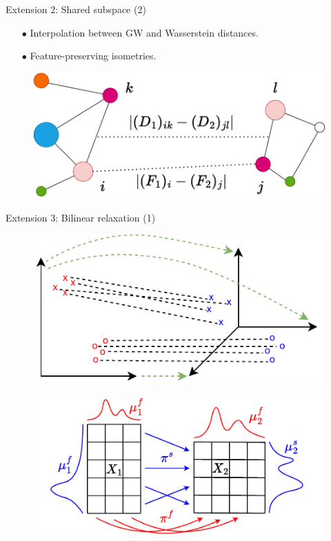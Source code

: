 \documentclass{beamer}
\begin{document}
\begin{frame}{Extension 2: Shared subspace (2)}
  \begin{minipage}[t]{0.6\linewidth}
    \begin{itemize}
      \item[$\bullet$] Interpolation between GW and Wasserstein distances.
      \item[$\bullet$] Feature-preserving isometries.
    \end{itemize}
    \end{minipage}%
    \hfill%
    \hspace{-6cm}
    \begin{minipage}[t]{0.45\linewidth}
      \vspace{-0.cm}
    \begin{figure}
      \centering
      \includegraphics[width=\linewidth, keepaspectratio=true]{OT_new/fgw.pdf}
    \end{figure}
    \end{minipage}

\end{frame}

\begin{frame}{Extension 3: Bilinear relaxation (1)}
  \begin{figure}
    \centering
    \includegraphics[width=0.7\linewidth, keepaspectratio=true]{OT_new/coot_new2.pdf}
  \end{figure}

  \begin{figure}
    \centering
    \includegraphics[width=0.7\linewidth, keepaspectratio=true]{OT_new/coot_matrix_ot.pdf}
  \end{figure}
\end{frame}
\end{document}
